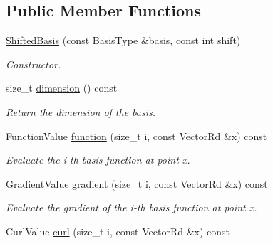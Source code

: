 \subsection*{Public Member Functions}
\begin{DoxyCompactItemize}
\item 
\hyperlink{classHArDCore3D_1_1ShiftedBasis_aea075c3cb8fbdd848e30d84821f23711}{Shifted\+Basis} (const Basis\+Type \&basis, const int shift)
\begin{DoxyCompactList}\small\item\em Constructor. \end{DoxyCompactList}\item 
\mbox{\label{classHArDCore3D_1_1ShiftedBasis_a0d1ffbb1cb714755de9035fcb9d5f183}} 
size\+\_\+t \hyperlink{classHArDCore3D_1_1ShiftedBasis_a0d1ffbb1cb714755de9035fcb9d5f183}{dimension} () const
\begin{DoxyCompactList}\small\item\em Return the dimension of the basis. \end{DoxyCompactList}\item 
\mbox{\label{classHArDCore3D_1_1ShiftedBasis_a67db64c53524c17389e1928ff7288101}} 
Function\+Value \hyperlink{classHArDCore3D_1_1ShiftedBasis_a67db64c53524c17389e1928ff7288101}{function} (size\+\_\+t i, const Vector\+Rd \&x) const
\begin{DoxyCompactList}\small\item\em Evaluate the i-\/th basis function at point x. \end{DoxyCompactList}\item 
\mbox{\label{classHArDCore3D_1_1ShiftedBasis_a1e825cd8aa68c4e1a1e3900e24be84f7}} 
Gradient\+Value \hyperlink{classHArDCore3D_1_1ShiftedBasis_a1e825cd8aa68c4e1a1e3900e24be84f7}{gradient} (size\+\_\+t i, const Vector\+Rd \&x) const
\begin{DoxyCompactList}\small\item\em Evaluate the gradient of the i-\/th basis function at point x. \end{DoxyCompactList}\item 
\mbox{\label{classHArDCore3D_1_1ShiftedBasis_adca4290363039ead695cd70ca589e04d}} 
Curl\+Value \hyperlink{classHArDCore3D_1_1ShiftedBasis_adca4290363039ead695cd70ca589e04d}{curl} (size\+\_\+t i, const Vector\+Rd \&x) const

\end{DoxyCompactItemize}
